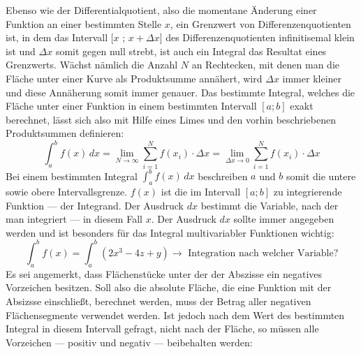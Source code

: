 Ebenso wie der Differentialquotient, also die momentane \"{A}nderung einer Funktion an einer bestimmten Stelle $x$, ein Grenzwert von Differenzenquotienten ist, in dem das Intervall [$x$ ; $x + \Delta x$] des Differenzenquotienten infinitisemal klein ist und $\Delta x$ somit gegen null strebt, ist auch ein Integral das Resultat eines Grenzwerts. W\"{a}chst n\"{a}mlich die Anzahl $N$ an Rechtecken, mit denen man die Fl\"{a}che unter einer Kurve als Produktsumme ann\"{a}hert, wird $\Delta x$ immer kleiner und diese Ann\"{a}herung somit immer genauer. Das bestimmte Integral, welches die Fl\"{a}che unter einer Funktion in einem bestimmten Intervall $[a ; b]$ exakt berechnet, l\"{a}sst sich also mit Hilfe eines Limes und den vorhin beschriebenen Produktsummen definieren: $$\int_{a}^{b} f(x) \,dx = \lim_{N \rightarrow \infty} \sum_{i=1}^{N} f(x_i) \cdot \Delta x = \lim_{\Delta x \rightarrow 0} \sum_{i=1}^{N} f(x_i) \cdot \Delta x$$ Bei einem bestimmten Integral $\int_{a}^{b} f(x) \, dx$ beschreiben $a$ und $b$ somit die untere sowie obere Intervallsgrenze. $f(x)$ ist die im Intervall $[a ; b]$ zu integrierende Funktion --- der Integrand. Der Ausdruck $dx$ bestimmt die Variable, nach der man integriert --- in diesem Fall $x$. Der Ausdruck $dx$ sollte immer angegeben werden und ist besonders f\"{u}r das Integral multivariabler Funktionen wichtig: $$\int_{a}^{b} f(x) = \int_{a}^{b} (2x^3 - 4z + y) \rightarrow \text{ Integration nach welcher Variable?}$$ Es sei angemerkt, dass Fl\"{a}chenst\"{u}cke unter der der Abszisse ein negatives Vorzeichen besitzen. Soll also die absolute Fl\"{a}che, die eine Funktion mit der Absizsse einschlie\ss{}t, berechnet werden, muss der Betrag aller negativen Fl\"{a}chensegmente verwendet werden. Ist jedoch nach dem Wert des bestimmten Integral in diesem Intervall gefragt, nicht nach der Fl\"{a}che, so m\"{u}ssen alle Vorzeichen --- positiv und negativ --- beibehalten werden:

\begin{figure}[h!]
	\centering
\end{figure}

